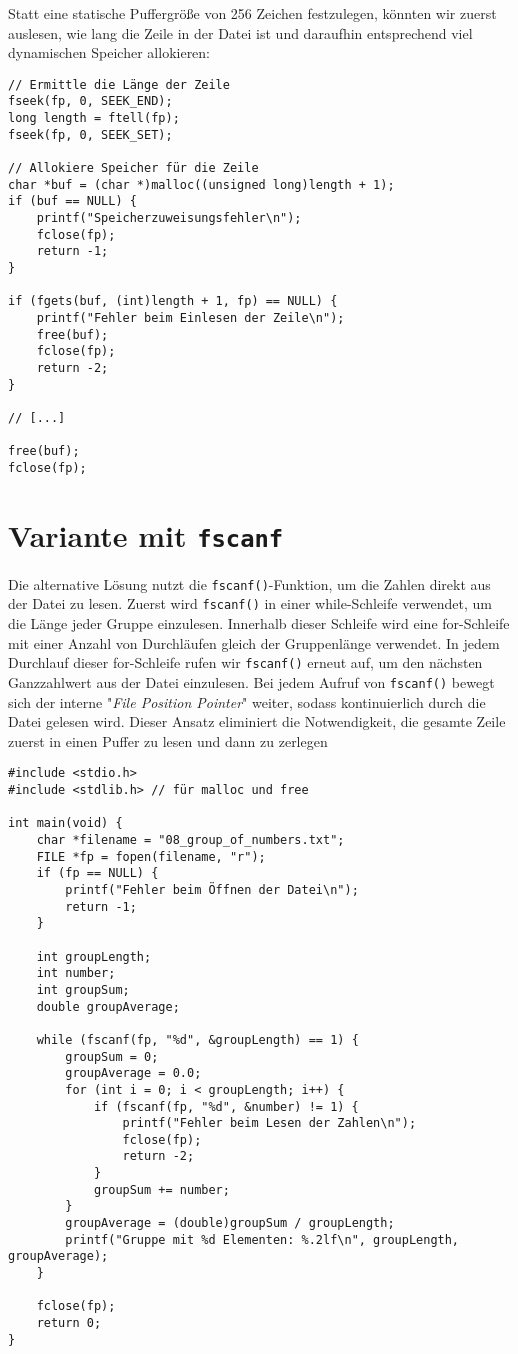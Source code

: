 Statt eine statische Puffergröße von 256 Zeichen festzulegen, könnten wir zuerst
auslesen, wie lang die Zeile in der Datei ist und daraufhin entsprechend viel
dynamischen Speicher allokieren:

\begin{verbatim}
// Ermittle die Länge der Zeile
fseek(fp, 0, SEEK_END);
long length = ftell(fp);
fseek(fp, 0, SEEK_SET);

// Allokiere Speicher für die Zeile
char *buf = (char *)malloc((unsigned long)length + 1);
if (buf == NULL) {
    printf("Speicherzuweisungsfehler\n");
    fclose(fp);
    return -1;
}

if (fgets(buf, (int)length + 1, fp) == NULL) {
    printf("Fehler beim Einlesen der Zeile\n");
    free(buf);
    fclose(fp);
    return -2;
}

// [...]

free(buf);
fclose(fp);
\end{verbatim}

\section*{Variante mit \texttt{fscanf}}

Die alternative Lösung nutzt die \texttt{fscanf()}-Funktion, um die
Zahlen direkt aus der Datei zu lesen. Zuerst wird \texttt{fscanf()} in
einer while-Schleife verwendet, um die Länge jeder Gruppe einzulesen. Innerhalb
dieser Schleife wird eine for-Schleife mit einer Anzahl von Durchläufen gleich
der Gruppenlänge verwendet. In jedem Durchlauf dieser for-Schleife rufen wir
\texttt{fscanf()} erneut auf, um den nächsten Ganzzahlwert aus der Datei
einzulesen. Bei jedem Aufruf von \texttt{fscanf()} bewegt sich der
interne "\textit{File Position Pointer}" weiter, sodass kontinuierlich durch die
Datei gelesen wird. Dieser Ansatz eliminiert die Notwendigkeit, die gesamte
Zeile zuerst in einen Puffer zu lesen und dann zu zerlegen

\begin{verbatim}
#include <stdio.h>
#include <stdlib.h> // für malloc und free

int main(void) {
    char *filename = "08_group_of_numbers.txt";
    FILE *fp = fopen(filename, "r");
    if (fp == NULL) {
        printf("Fehler beim Öffnen der Datei\n");
        return -1;
    }

    int groupLength;
    int number;
    int groupSum;
    double groupAverage;

    while (fscanf(fp, "%d", &groupLength) == 1) {
        groupSum = 0;
        groupAverage = 0.0;
        for (int i = 0; i < groupLength; i++) {
            if (fscanf(fp, "%d", &number) != 1) {
                printf("Fehler beim Lesen der Zahlen\n");
                fclose(fp);
                return -2;
            }
            groupSum += number;
        }
        groupAverage = (double)groupSum / groupLength;
        printf("Gruppe mit %d Elementen: %.2lf\n", groupLength, groupAverage);
    }

    fclose(fp);
    return 0;
}
\end{verbatim}
